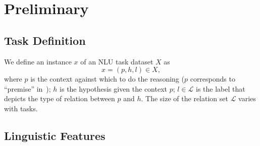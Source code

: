 \section{Preliminary}
\label{sec:formulation}
\subsection{Task Definition}
We define an instance $x$ of an NLU task 
dataset $X$ as
\begin{equation}
    x = (p, h, l) \in X, \label{eq:nli}
\end{equation}
\noindent
where $p$ is the context against which to do the reasoning ($p$ corresponds 
to ``premise'' in~);
$h$ is the hypothesis given the context $p$; 
$l \in \mathcal{L}$ is the label that 
depicts the type of relation between $p$ and $h$. 
The size of the relation set $\mathcal{L}$ varies with tasks. 



\subsection{Linguistic Features}
\label{sec:extract}

